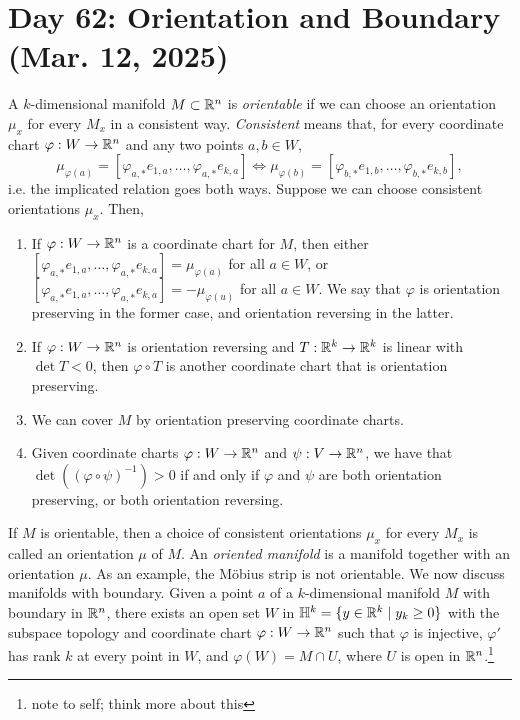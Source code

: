 \section{Day 62: Orientation and Boundary (Mar. 12, 2025)}
A $k$-dimensional manifold $M \subset \mathbb R^n$ is \textit{orientable} if we can choose an orientation $\mu_x$ for every $M_x$ in a consistent way. \textit{Consistent} means that, for every coordinate chart $\varphi : W \to \mathbb R^n$ and any two points $a, b \in W$,
\[ \mu_{\varphi(a)} = [\varphi_{a, \ast} e_{1,a}, \dots, \varphi_{a, \ast} e_{k,a}]  \iff \mu_{\varphi(b)} = [\varphi_{b, \ast} e_{1,b}, \dots, \varphi_{b, \ast} e_{k,b}], \]
i.e. the implicated relation goes both ways. Suppose we can choose consistent orientations $\mu_x$. Then,
\begin{enumerate}[label=(\roman*)]
    \item If $\varphi : W \to \mathbb R^n$ is a coordinate chart for $M$, then either $[\varphi_{a, \ast} e_{1, a}, \dots, \varphi_{a, \ast} e_{k, a}] = \mu_{\varphi(a)}$ for all $a \in W$, or $[\varphi_{a, \ast} e_{1, a}, \dots, \varphi_{a, \ast} e_{k, a}] = - \mu_{\varphi(u)}$ for all $a \in W$. We say that $\varphi$ is orientation preserving in the former case, and orientation reversing in the latter.
    \item If $\varphi : W \to \mathbb R^n$ is orientation reversing and $T : \mathbb R^k \to \mathbb R^k$ is linear with $\det T < 0$, then $\varphi \circ T$ is another coordinate chart that is orientation preserving.
    \item We can cover $M$ by orientation preserving coordinate charts.
    \item Given coordinate charts $\varphi : W \to \mathbb R^n$ and $\psi : V \to \mathbb R^n$, we have that $\det((\varphi \circ \psi)^{-1}) > 0$ if and only if $\varphi$ and $\psi$ are both orientation preserving, or both orientation reversing.
\end{enumerate}
If $M$ is orientable, then a choice of consistent orientations $\mu_x$ for every $M_x$ is called an orientation $\mu$ of $M$. An \textit{oriented manifold} is a manifold together with an orientation $\mu$. As an example, the M\"obius strip is not orientable.
\medskip\newline
We now discuss manifolds with boundary. Given a point $a$ of a $k$-dimensional manifold $M$ with boundary in $\mathbb R^n$, there exists an open set $W$ in $\mathbb H^k = \{ y \in \mathbb R^k \mid y_k \geq 0 \}$ with the subspace topology and coordinate chart $\varphi : W \to \mathbb R^n$ such that $\varphi$ is injective, $\varphi'$ has rank $k$ at every point in $W$, and $\varphi(W) = M \cap U$, where $U$ is open in $\mathbb R^n$.\footnote{note to self; think more about this}
